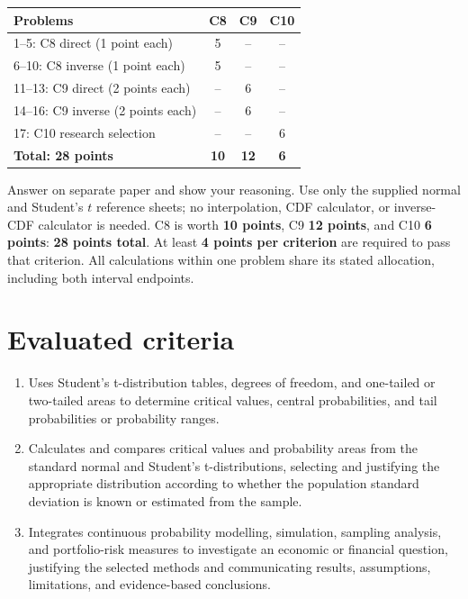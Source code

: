 \begin{center}
\begin{tabular}{|l|c|c|c|}
\hline
\textbf{Problems} & \textbf{C8} & \textbf{C9} & \textbf{C10}\\ \hline
1--5: C8 direct (1 point each) & 5 & -- & --\\ \hline
6--10: C8 inverse (1 point each) & 5 & -- & --\\ \hline
11--13: C9 direct (2 points each) & -- & 6 & --\\ \hline
14--16: C9 inverse (2 points each) & -- & 6 & --\\ \hline
17: C10 research selection & -- & -- & 6\\ \hline
\textbf{Total: 28 points} & \textbf{10} & \textbf{12} & \textbf{6}\\ \hline
\end{tabular}
\end{center}
Answer on separate paper and show your reasoning. Use only the supplied normal and Student's $t$ reference sheets; no interpolation, CDF calculator, or inverse-CDF calculator is needed.
C8 is worth \textbf{10 points}, C9 \textbf{12 points}, and C10 \textbf{6 points}: \textbf{28 points total}.
At least \textbf{4 points per criterion} are required to pass that criterion.
All calculations within one problem share its stated allocation, including both interval endpoints.

\section*{Evaluated criteria}
\begin{enumerate}[label=\textbf{C\arabic*},start=8,leftmargin=3em]
\item Uses Student's t-distribution tables, degrees of freedom, and one-tailed or two-tailed areas to determine critical values, central probabilities, and tail probabilities or probability ranges.
\item Calculates and compares critical values and probability areas from the standard normal and Student's t-distributions, selecting and justifying the appropriate distribution according to whether the population standard deviation is known or estimated from the sample.
\item Integrates continuous probability modelling, simulation, sampling analysis, and portfolio-risk measures to investigate an economic or financial question, justifying the selected methods and communicating results, assumptions, limitations, and evidence-based conclusions.
\end{enumerate}

